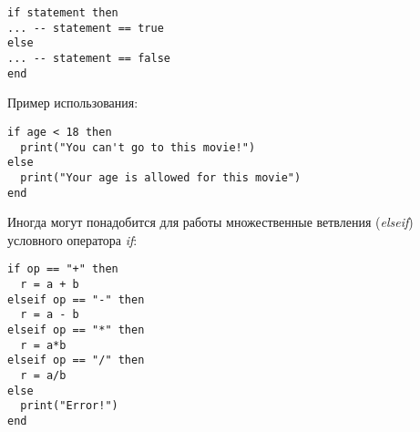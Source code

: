 \begin{lstlisting}
if statement then
... -- statement == true
else
... -- statement == false
end
\end{lstlisting}

Пример использования:

\begin{lstlisting}
if age < 18 then
  print("You can't go to this movie!")
else
  print("Your age is allowed for this movie")
end
\end{lstlisting}

Иногда могут понадобится для работы множественные ветвления (\emph{elseif}) условного оператора \emph{if}:

\begin{lstlisting}
if op == "+" then
  r = a + b
elseif op == "-" then
  r = a - b
elseif op == "*" then
  r = a*b
elseif op == "/" then
  r = a/b
else
  print("Error!")
end
\end{lstlisting}

